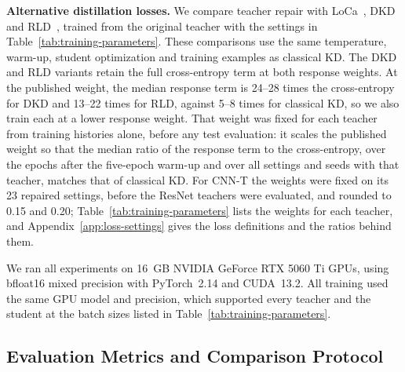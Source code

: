 \documentclass[review,number,sort&compress]{elsarticle}
\theoremstyle{definition}
\begin{document}
\textbf{Alternative distillation losses.} We compare teacher repair
with LoCa~\citep{yang2024loca}, DKD~\citep{zhao2022decoupled} and
RLD~\citep{sun2025knowledge}, trained from the original teacher with
the settings in Table~\ref{tab:training-parameters}. These
comparisons use the same temperature, warm-up, student optimization
and training examples as classical KD. The DKD and RLD variants
retain the full cross-entropy term at both response weights. At the
published weight, the median response term is 24--28 times the
cross-entropy for DKD and 13--22 times for RLD, against 5--8 times for
classical KD, so we also train each at a lower response weight. That
weight was fixed for each teacher from training histories alone,
before any test evaluation: it scales the published weight so that
the median ratio of the response term to the cross-entropy, over the
epochs after the five-epoch warm-up and over all settings and seeds
with that teacher, matches that of classical KD. For CNN-T the weights
were fixed on its 23 repaired settings, before the ResNet teachers
were evaluated, and rounded to 0.15 and 0.20;
Table~\ref{tab:training-parameters} lists the weights for each
teacher, and Appendix~\ref{app:loss-settings} gives the loss
definitions and the ratios behind them.

We ran all experiments on 16~GB NVIDIA GeForce RTX 5060 Ti
GPUs, using bfloat16 mixed precision with PyTorch~2.14 and
CUDA~13.2. All training used the same GPU model and precision, which
supported every teacher and the student at the batch sizes listed in
Table~\ref{tab:training-parameters}.

\subsection{Evaluation Metrics and Comparison Protocol}
\label{sec:evaluation-metrics}
\end{document}
